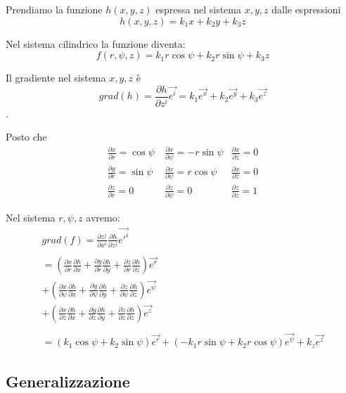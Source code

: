 \documentclass[a4paper,11pt]{article}
\begin{document}
Prendiamo la funzione $ h(x, y, z) $ espressa nel sistema $ x, y, z $ dalle espressioni
\[
  h(x, y, z) =  k_1 x +k_2 y + k_3 z
\]

Nel sistema cilindrico la funzione diventa:
\[
  f( r, \psi, z) =  k_1 r \cos \psi + k_2 r \sin \psi + k_3 z
\]

Il gradiente nel sistema $ x, y, z $ è
\[ grad(h) = \frac{\partial h}{\partial z^i} \vec {e^i}
  = k_1 \vec {e^x} + k_2 \vec {e^y} + k_3 \vec {e^z}
\].

Posto che
\[
\begin{array}{rrr}
  \frac{\partial x}{\partial r} = \cos \psi\ & \frac{\partial x}{\partial \psi} = -r \sin \psi & \frac{\partial x}{\partial z} = 0
  \\
  \frac{\partial y}{\partial r} = \sin \psi\ & \frac{\partial x}{\partial \psi} = r \cos \psi & \frac{\partial x}{\partial z} = 0
  \\
  \frac{\partial z}{\partial r} = 0\ & \frac{\partial z}{\partial \psi} = 0 & \frac{\partial z}{\partial z} = 1
\end{array}
\]

Nel sistema $ r, \psi, z $ avremo:
\begin{eqnarray*}
	grad (f) = \frac{\partial z^j}{\partial x^i} \frac{\partial h}{\partial z^j} \vec {{e'}^i}
  \\
  \\
	= \left( \frac{\partial x}{\partial r} \frac{\partial h}{\partial x} + \frac{\partial y}{\partial r} \frac{\partial h}{\partial y} + \frac{\partial z}{\partial r} \frac{\partial h}{\partial z} \right) \vec {e^r}
  \\
	+ \left( \frac{\partial x}{\partial \psi} \frac{\partial h}{\partial x} + \frac{\partial y}{\partial \psi} \frac{\partial h}{\partial y} + \frac{\partial z}{\partial \psi} \frac{\partial h}{\partial z} \right) \vec {e^\psi}
  \\
	+ \left( \frac{\partial x}{\partial z} \frac{\partial h}{\partial x} + \frac{\partial y}{\partial z} \frac{\partial h}{\partial y} + \frac{\partial z}{\partial z} \frac{\partial h}{\partial z} \right) \vec {e^z}
\\
\\
	= (k_1 \cos \psi + k_2 \sin \psi) \vec {e^r} + (-k_1 r \sin \psi + k_2 r \cos \psi) \vec {e^\psi} + k_z \vec {e^z}
\end{eqnarray*}


\subsection{Generalizzazione}
\end{document}

